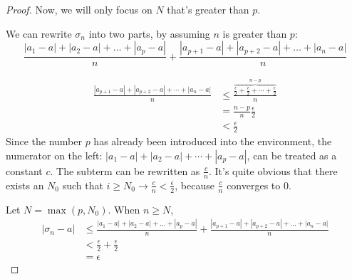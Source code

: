 \documentclass{article}
\begin{document}
\begin{itemize}
\begin{proof}
  Now, we will only focus on $N$ that's greater than $p$.

  We can rewrite $\sigma_n$ into two parts, by assuming $n$ is greater than $p$:
  \[
    \frac{|a_1-a|+|a_2-a|+\ldots +|a_p-a|}{n} + \frac{|a_{p+1}-a|+|a_{p+2}-a|+\ldots+|a_{n}-a|}{n}
  \]

  \begin{equation*}
    \begin{split}
      \frac{|a_{p+1}-a|+|a_{p+2}-a|+\cdots +|a_{n}-a|}{n}
      & \leq \frac{\overbrace{\frac{\epsilon}{2}+\frac{\epsilon}{2}+\cdots+\frac{\epsilon}{2}}^{n-p}}{n} \\
      & = \frac{n-p}{n} \frac{\epsilon}{2}\\
      & < \frac{\epsilon}{2}
    \end{split}
  \end{equation*}
  Since the number $p$ has already been introduced into the environment, the numerator on the left: $|a_1-a|+|a_2-a|+\cdots +|a_p-a|$, can be treated as a constant $c$. The subterm can be rewritten as $\frac{c}{n}$. It's quite obvious that there exists an $N_0$ such that $i \geq N_0 \rightarrow \frac{c}{n} < \frac{\epsilon}{2}$, because $\frac{c}{n}$ converges to $0$.

  Let $N = \max(p,N_0)$. When $n \geq N$,
  \begin{equation*}
    \begin{split}
      |\sigma_n - a|
      &\leq \frac{|a_1-a|+|a_2-a|+\ldots +|a_p-a|}{n} + \frac{|a_{p+1}-a|+|a_{p+2}-a|+\ldots+|a_{n}-a|}{n}\\
      &< \frac{\epsilon}{2} + \frac{\epsilon}{2}\\
      &= \epsilon
    \end{split}
  \end{equation*}
  
\end{proof}

\end{itemize}
\end{document}
